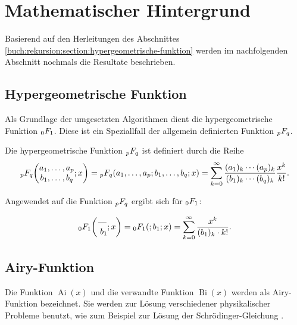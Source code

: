 %
%
%
\section{Mathematischer Hintergrund
\label{0f1:section:mathHintergrund}}
Basierend auf den Herleitungen des Abschnittes \ref{buch:rekursion:section:hypergeometrische-funktion} werden im nachfolgenden Abschnitt nochmals die Resultate beschrieben.

\subsection{Hypergeometrische Funktion
\label{0f1:subsection:hypergeometrisch}}
Als Grundlage der umgesetzten Algorithmen dient die hypergeometrische Funktion $\mathstrut_0F_1$. Diese ist ein Speziallfall der allgemein definierten Funktion $\mathstrut_pF_q$.

\begin{definition}
	\label{0f1:math:qFp:def}
	Die hypergeometrische Funktion
	$\mathstrut_pF_q$ ist definiert durch die Reihe
	\[
	\mathstrut_pF_q
	\biggl(
	\begin{matrix}
		a_1,\dots,a_p\\
		b_1,\dots,b_q
	\end{matrix}
	;
	x
	\biggr)
	=
	\mathstrut_pF_q(a_1,\dots,a_p;b_1,\dots,b_q;x)
	=
	\sum_{k=0}^\infty
	\frac{(a_1)_k\cdots(a_p)_k}{(b_1)_k\cdots(b_q)_k}\frac{x^k}{k!}.
	\]
\end{definition}

Angewendet auf die Funktion $\mathstrut_pF_q$ ergibt sich für $\mathstrut_0F_1$:

\begin{equation}
    \label{0f1:math:0f1:eq}
    \mathstrut_0F_1
    \biggl(
    \begin{matrix}
    \text{---}
    \\\
    b_1
    \end{matrix}
    ;
    x
    \biggr)
    =
    \mathstrut_0F_1(;b_1;x)
    =
    \sum_{k=0}^\infty
    \frac{x^k}{(b_1)_k \cdot k!}.
\end{equation}




\subsection{Airy-Funktion
\label{0f1:subsection:airy}}
Die Funktion $\operatorname{Ai}(x)$ und die verwandte Funktion $\operatorname{Bi}(x)$ werden als Airy-Funktion bezeichnet. Sie werden zur Lösung verschiedener physikalischer Probleme benutzt, wie zum Beispiel zur Lösung der Schrödinger-Gleichung \cite{0f1:wiki-airyFunktion}.


